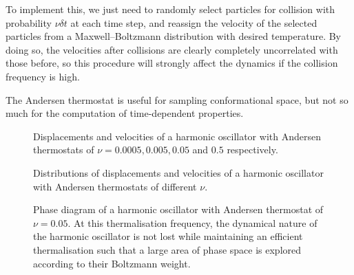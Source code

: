 \documentclass{article}
\theoremstyle{plain}\theoremheaderfont{\normalfont\itshape}\theorembodyfont{\rmfamily}\theoremseparator{.}\newtheorem*{rem}{Remark}\newtheorem*{ex}{Example}\newtheorem*{proof}{Proof}\newtheorem*{altp}{Alternative proof}
\theoremstyle{plain}\theoremheaderfont{\normalfont\bfseries}\theorembodyfont{\rmfamily}\theoremseparator{.}\newtheorem{thm}{Theorem}[section]\newtheorem{lem}[thm]{Lemma}\newtheorem{prop}[thm]{Proposition}\newtheorem*{cor}{Corollary}\newtheorem{defn}[thm]{Definition}\newtheorem{clm}[thm]{Claim}\newtheorem{clminproof}{Claim}\newtheorem{alg}[thm]{Algorithm}\newtheorem{hyp}[thm]{Hypothesis}\newtheorem{law}[thm]{Law}
\theoremstyle{break}\theoremheaderfont{\normalfont\itshape}\theorembodyfont{\rmfamily}\theoremseparator{.\medskip}\newtheorem*{proofskip}{Proof}\newtheorem*{exs}{Examples}\newtheorem*{rems}{Remarks}
\theoremstyle{break}\theoremheaderfont{\normalfont\bfseries}\theorembodyfont{\rmfamily}\theoremseparator{.\medskip}\newtheorem{lemskip}[thm]{Lemma}\newtheorem{defnskip}[thm]{Definition}\newtheorem{propskip}[thm]{Proposition}\newtheorem{thmskip}[thm]{Theorem}
\numberwithin{equation}{section}
\begin{document}
    To implement this, we just need to randomly select particles for collision with probability \(\nu\delta t\) at each time step, and reassign the velocity of the selected particles from a Maxwell--Boltzmann distribution with desired temperature. By doing so, the velocities after collisions are clearly completely uncorrelated with those before, so this procedure will strongly affect the dynamics if the collision frequency is high.

    The Andersen thermostat is useful for sampling conformational space, but not so much for the computation of time-dependent properties.

    \begin{figure}[ht!]
        \centering
        
        \caption{Displacements and velocities of a harmonic oscillator with Andersen thermostats of \(\nu=0.0005,0.005,0.05\) and \(0.5\) respectively.}
    \end{figure}

    \begin{figure}[ht!]
        \centering
        
        \caption{Distributions of displacements and velocities of a harmonic oscillator with Andersen thermostats of different \(\nu\).}
    \end{figure}

    \begin{figure}[ht!]
        \centering
        
        \caption{Phase diagram of a harmonic oscillator with Andersen thermostat of \(\nu=0.05\). At this thermalisation frequency, the dynamical nature of the harmonic oscillator is not lost while maintaining an efficient thermalisation such that a large area of phase space is explored according to their Boltzmann weight.}
    \end{figure}
\end{document}
